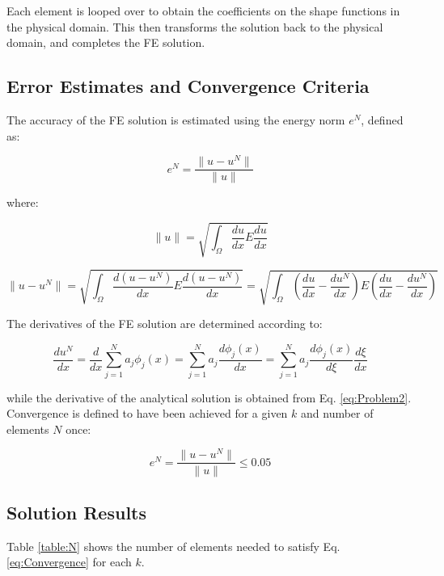 \documentclass[10pt]{article}
\begin{document}
Each element is looped over to obtain the coefficients on the shape functions in the physical domain. This then transforms the solution back to the physical domain, and completes the FE solution.

\subsection{Error Estimates and Convergence Criteria}

The accuracy of the FE solution is estimated using the energy norm \(e^N\), defined as:

\begin{equation}
e^N=\frac{\|u-u^N\|}{\|u\|}
\end{equation}

where:

\begin{equation}
\|u\|=\sqrt{\int_{\Omega}^{}\frac{du}{dx}E\frac{du}{dx}}
\end{equation}

\begin{equation}
\|u-u^N\|=\sqrt{\int_{\Omega}^{}\frac{d(u-u^N)}{dx}E\frac{d(u-u^N)}{dx}}=\sqrt{\int_{\Omega}^{}\left(\frac{du}{dx}-\frac{du^N}{dx}\right)E\left(\frac{du}{dx}-\frac{du^N}{dx}\right)}
\end{equation}

The derivatives of the FE solution are determined according to:

\begin{equation}
\frac{du^N}{dx}=\frac{d}{dx}\sum_{j=1}^{N}a_j\phi_j(x)=\sum_{j=1}^{N}a_j\frac{d\phi_j(x)}{dx}=\sum_{j=1}^{N}a_j\frac{d\phi_j(x)}{d\xi}\frac{d\xi}{dx}
\end{equation}

while the derivative of the analytical solution is obtained from Eq. \eqref{eq:Problem2}. Convergence is defined to have been achieved for a given \(k\) and number of elements \(N\) once:

\begin{equation}
\label{eq:Convergence}
e^N=\frac{\|u-u^N\|}{\|u\|} \leq 0.05
\end{equation}

\subsection{Solution Results}

Table \ref{table:N} shows the number of elements needed to satisfy Eq. \eqref{eq:Convergence} for each \(k\).
\end{document}
